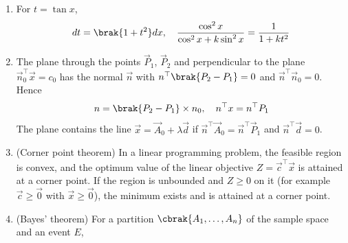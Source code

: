 \begin{enumerate}[label=\thesubsection.\arabic*, ref=\thesubsection.\theenumi]
\solution For \eqref{eq:EE26BTECH11205-sums}, let $S = \sum_{i=1}^{n}i$. Writing the sum forwards and backwards and adding term by term, each of the $n$ pairs adds up to $n+1$, so
\begin{align}
	2S = n\brak{n+1} \implies \sum_{i=1}^{n}i = \frac{n\brak{n+1}}{2}
\end{align}
For the second sum, use $\brak{i+1}^3 - i^3 = 3i^2 + 3i + 1$ and add for $i = 1,\dots,n$. The left side telescopes to $\brak{n+1}^3 - 1$, so
\begin{align}
	\brak{n+1}^3 - 1 = 3\sum_{i=1}^{n}i^2 + 3\,\frac{n\brak{n+1}}{2} + n
\end{align}
Since $\brak{n+1}^3 - 1 - n = n\brak{n+1}\brak{n+2}$,
\begin{align}
	3\sum_{i=1}^{n}i^2 &= n\brak{n+1}\brak{n+2} - \frac{3n\brak{n+1}}{2} \notag
	\\
	&= \frac{n\brak{n+1}\brak{2n+1}}{2} \notag
	\\
	\implies \sum_{i=1}^{n}i^2 &= \frac{n\brak{n+1}\brak{2n+1}}{6}
\end{align}
\item For $t = \tan x$,
\begin{align}
	dt = \brak{1+t^2}dx,\quad \frac{\cos^2x}{\cos^2x + k\sin^2x} = \frac{1}{1+kt^2} \label{eq:EE26BTECH11205-tan-sub}
\end{align}
\item The plane through the points $\vec{P}_1$, $\vec{P}_2$ and perpendicular to the plane $\vec{n}_0^{\top}\vec{x} = c_0$ has the normal $\vec{n}$ with $\vec{n}^{\top}\brak{\vec{P}_2-\vec{P}_1} = 0$ and $\vec{n}^{\top}\vec{n}_0 = 0$. Hence
\begin{align}
	\vec{n} = \brak{\vec{P}_2-\vec{P}_1}\times\vec{n}_0,\quad \vec{n}^{\top}\vec{x} = \vec{n}^{\top}\vec{P}_1 \label{eq:EE26BTECH11205-plane-pts}
\end{align}
The plane contains the line $\vec{x} = \vec{A}_0 + \lambda\vec{d}$ if $\vec{n}^{\top}\vec{A}_0 = \vec{n}^{\top}\vec{P}_1$ and $\vec{n}^{\top}\vec{d} = 0$.
\item (Corner point theorem) In a linear programming problem, the feasible region is convex, and the optimum value of the linear objective $Z = \vec{c}^{\top}\vec{x}$ is attained at a corner point. If the region is unbounded and $Z \ge 0$ on it (for example $\vec{c} \ge \vec{0}$ with $\vec{x}\ge\vec{0}$), the minimum exists and is attained at a corner point. \label{eq:EE26BTECH11205-lpp}
\item (Bayes' theorem) For a partition $\cbrak{A_1,\dots,A_n}$ of the sample space and an event $E$,

\end{enumerate}
